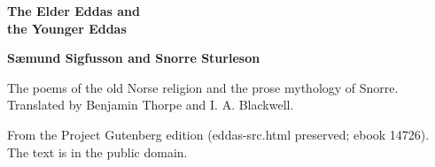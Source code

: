 \documentclass[11pt,letterpaper]{article}
\begin{document}
\color{ink}

\begin{titlepage}
\centering
\vspace*{4em}
{\LARGE\bfseries\color{heading} The Elder Eddas and\\[0.3em]the Younger Eddas\par}
\vspace{2em}
{\Large\bfseries\color{heading} S\ae{}mund Sigfusson and Snorre Sturleson\par}
\vspace{2.5em}
{\itshape\color{subhead}\parbox{0.8\linewidth}{\centering The poems of the old Norse religion and the prose mythology of Snorre. Translated by Benjamin Thorpe and I. A. Blackwell.\par}}
\vfill
{\small From the Project Gutenberg edition (eddas-src.html preserved; ebook 14726). The text is in the public domain.\par}
\vspace{2em}
\end{titlepage}

\tableofcontents


\end{document}
